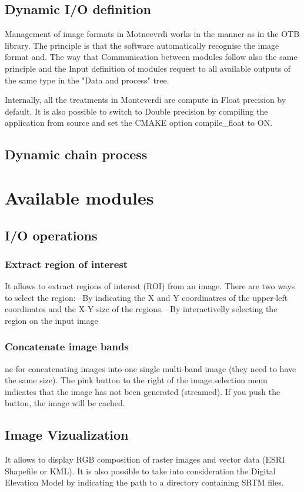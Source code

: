 \documentclass{InsightSoftwareGuide}
\begin{document}
\section{Dynamic I/O definition}
Management of image formats in Motneevrdi works in the manner as in the OTB library.
The principle is that the software automatically recognise the image format and.
The way that
Communication between modules follow also the same principle and the Input definition of modules request to all available
outputs of the same type in the "Data and process" tree.

Internally, all the treatments in Monteverdi are compute in Float precision by default. It is also possible to switch to Double 
precision by compiling the application from source and set the CMAKE option compile_float to ON.
 

\section{Dynamic chain process}


\chapter{Available modules}
\section{I/O operations}
\subsection{Extract region of interest}
It allows to extract regions of interest (ROI) from an image. There are two ways to select the region:
--By indicating the X and Y coordinatres of the upper-left coordinates and the X-Y size of the regions.
--By interactivelly selecting the region on the input image
\subsection{Concatenate image bands}
ne for concatenating images into one single multi-band image (they need to have the same size).
The pink button to the right of the image selection menu indicates that the image has not been generated (streamed). 
If you push the button, the image will be cached. 
\section{Image Vizualization}
It allows to display RGB composition of raster images and vector data (ESRI Shapefile or KML). It is also possible to take 
into consideration the Digital Elevation Model by indicating the path to a directory containing SRTM files. 
\end{document}
